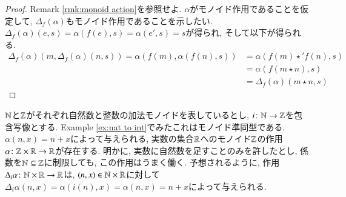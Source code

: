 \begin{proof}

Remark \ref{rmk:monoid action}を参照せよ. $\alpha$がモノイド作用であることを仮定して, $\Delta_f(\alpha)$もモノイド作用であることを示したい. $\Delta_f(\alpha)(e,s)=\alpha(f(e),s)=\alpha(e',s)=s$が得られ, そして以下が得られる. 
\begin{align*}
\Delta_f(\alpha)(m,\Delta_f(\alpha)(n,s))=\alpha(f(m),\alpha(f(n),s))&=\alpha(f(m)\star' f(n),s)\\
&=\alpha(f(m\star n),s)\\
&=\Delta_f(\alpha)(m\star n,s)
\end{align*}

\end{proof}

\begin{example}


${\mathbb N}$と${\mathbb Z}$がそれぞれ自然数と整数の加法モノイドを表しているとし, $i\colon{\mathbb N}\rightarrow{\mathbb Z}$を包含写像とする. Example \ref{ex:nat to int}でみたこれはモノイド準同型である. $\alpha(n,x)=n+x$によって与えられる, 実数の集合${\mathbb R}$へのモノイド${\mathbb Z}$の作用$\alpha\colon{\mathbb Z}\times{\mathbb R}\rightarrow{\mathbb R}$が存在する. 明かに, 実数に自然数を足すことのみを許したとし, 係数を${\mathbb N}\subseteq{\mathbb Z}$に制限しても, この作用はうまく働く. 予想されるように, 作用$\Delta_i\alpha\colon{\mathbb N}\times{\mathbb R}\rightarrow{\mathbb R}$は, $(n,x)\in{\mathbb N}\times{\mathbb R}$に対して$\Delta_i\alpha(n,x)=\alpha(i(n),x)=\alpha(n,x)=n+x$によって与えられる.

\end{example}

